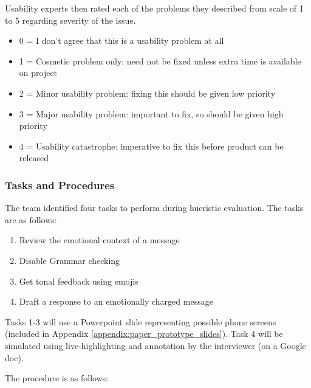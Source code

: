 \documentclass[acmsmall,screen,authorversion,nonacm]{acmart}
\begin{document}
Usability experts then rated each of the problems they described from scale of 1 to 5 regarding severity of the issue. 

\begin{itemize}
    \item 0 = I don't agree that this is a usability problem at all
    \item 1 = Cosmetic problem only: need not be fixed unless extra time is available on project
    \item 2 = Minor usability problem: fixing this should be given low priority
    \item 3 = Major usability problem: important to fix, so should be given high priority
    \item 4 = Usability catastrophe: imperative to fix this before product can be released
\end{itemize}

\subsubsection{Tasks and Procedures}

The team identified four tasks to perform during hueristic evaluation. The tasks are as follows:

\begin{enumerate}
    \item Review the emotional context of a message
    \item Disable Grammar checking
    \item Get tonal feedback using emojis
    \item Draft a response to an emotionally charged message
\end{enumerate}

Tasks 1-3 will use a Powerpoint slide representing possible phone screens (included in Appendix \ref{appendix:paper_prototype_slides}). Task 4 will be simulated using live-highlighting and annotation by the interviewer (on a Google doc).

The procedure is as follows:
\end{document}
